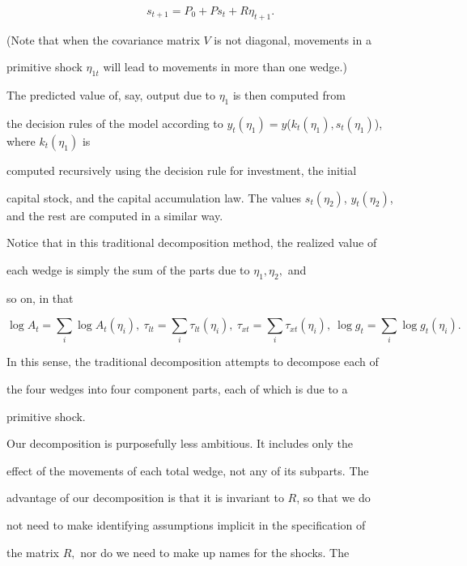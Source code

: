 \documentclass[fleqn,leqno,11pt]{article}
\begin{document}
\[

s_{t+1}=P_{0}+Ps_{t}+R\eta _{t+1}. 

\]%

(Note that when the covariance matrix $V$ is not diagonal, movements in a

primitive shock $\eta _{1t}$ will lead to movements in more than one wedge.)

The predicted value of, say, output due to $\eta _{1}$ is then computed from

the decision rules of the model according to $y_{t}(\eta _{1})=y${\large (}$%

k_{t}(\eta _{1}),s_{t}(\eta _{1})${\large )}, where $k_{t}(\eta _{1})$ is

computed recursively using the decision rule for investment, the initial

capital stock, and the capital accumulation law. The values $s_{t}(\eta

_{2}) $, $y_{t}(\eta _{2})$, and the rest are computed in a similar way.



Notice that in this traditional decomposition method, the realized value of

each wedge is simply the sum of the parts due to $\eta _{1},\eta _{2},$ and

so on, in that 

\[

\log A_{t}=\sum_{i}\log A_{t}(\eta _{i}),~\tau _{lt}=\sum_{i}\tau _{lt}(\eta

_{i}),~\tau _{xt}=\sum_{i}\tau _{xt}(\eta _{i}),~\log g_{t}=\sum_{i}\log

g_{t}(\eta _{i}). 

\]%

In this sense, the traditional decomposition attempts to decompose each of

the four wedges into four component parts, each of which is due to a

primitive shock.



Our decomposition is purposefully less ambitious. It includes only the

effect of the movements of each total wedge, not any of its subparts. The

advantage of our decomposition is that it is invariant to $R$, so that we do

not need to make identifying assumptions implicit in the specification of

the matrix $R,$ nor do we need to make up names for the shocks. The
\end{document}
